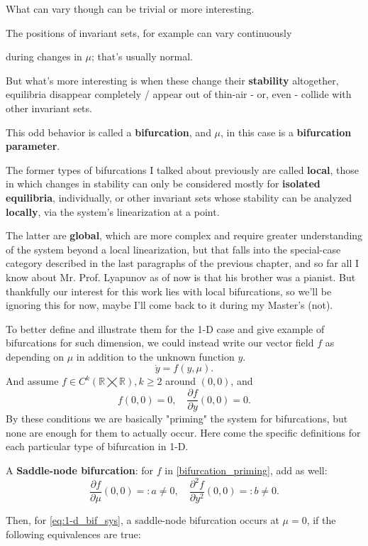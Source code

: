 What can vary though can be trivial or more interesting.

The positions of invariant sets, for example can vary continuously

during changes in $\mu$; that's usually normal.

But what's more interesting is when these change their \textbf{stability} altogether, equilibria disappear completely / appear out of thin-air - or, even - collide with other invariant sets.

This odd behavior is called a \textbf{bifurcation}, and $\mu$, in this case is a \textbf{bifurcation parameter}.

The former types of bifurcations I talked about previously are called \textbf{local}, those in which changes in stability can only be considered mostly for \textbf{isolated equilibria}, individually, or other invariant sets whose stability can be analyzed \textbf{locally}, via the system's linearization at a point.

The latter are \textbf{global}, which are more complex and require greater understanding of the system beyond a local linearization, but that falls into the special-case category described in the last paragraphs of the previous chapter, and so far all I know about Mr. Prof. Lyapunov as of now is that his brother was a pianist. But thankfully our interest for this work lies with local bifurcations, so we'll be ignoring this for now, maybe I'll come back to it during my Master's (not).

To better define and illustrate them for the 1-D case and give example of bifurcations for such dimension, we could instead write our vector field $f$ as depending on $\mu$ in addition to the unknown function $y$.
\begin{equation}\label{eq:1-d_bif_sys}
	\dot{y} = f(y, \mu).
\end{equation}
And assume $f \in C^k(\mathbb{R} \bigtimes \mathbb{R}), k \geq 2 $ around $(0,0)$, and
\begin{equation}\label{bifurcation_priming}
	f(0,0) = 0, \quad \frac{\partial f}{\partial y}(0,0) = 0.
\end{equation}
By these conditions we are basically "priming" the system for bifurcations, but none are enough for them to actually occur. Here come the specific definitions for each particular type of bifurcation in 1-D.

\begin{definition}
	A \textbf{Saddle-node bifurcation}:
	for $f$ in \ref{bifurcation_priming}, add as well:
	\begin{equation*}
		\frac{\partial f}{\partial \mu}(0,0) =: a \neq 0, \quad \frac{\partial^2 f}{\partial y^2}(0,0) =:b \neq 0.
	\end{equation*}
\end{definition}
Then, for \ref{eq:1-d_bif_sys}, a saddle-node bifurcation occurs at $\mu = 0$, if the following equivalences are true:

